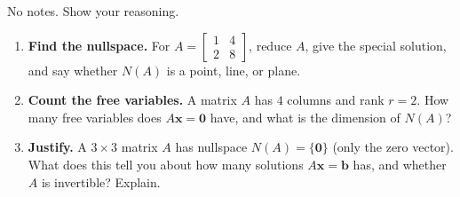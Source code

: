 \documentclass[10pt]{article}
\newcommand{\xx}{\mathbf{x}}
\newcommand{\bb}{\mathbf{b}}
\newcommand{\zero}{\mathbf{0}}
\begin{document}
\namedateperiod

\vspace{0.15in}

No notes. Show your reasoning.

\begin{enumerate}[leftmargin=1.8em, itemsep=16pt]
  \item \textbf{Find the nullspace.} For $A=\begin{bmatrix} 1 & 4 \\ 2 & 8 \end{bmatrix}$, reduce $A$,
        give the special solution, and say whether $N(A)$ is a point, line, or plane.
  \item \textbf{Count the free variables.} A matrix $A$ has $4$ columns and rank $r=2$. How many free
        variables does $A\xx=\zero$ have, and what is the dimension of $N(A)$?
  \item \textbf{Justify.} A $3\times3$ matrix $A$ has nullspace $N(A)=\{\zero\}$ (only the zero vector).
        What does this tell you about how many solutions $A\xx=\bb$ has, and whether $A$ is invertible?
        Explain.
\end{enumerate}
\end{document}

